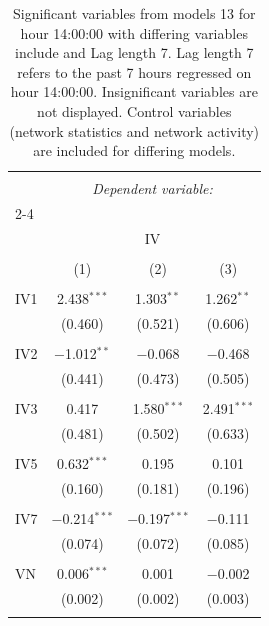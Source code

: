 
\begin{table}[!htbp] \centering 
  \caption{Significant variables from models 13 for hour 14:00:00 with differing variables include 
                               and Lag length 7. Lag length 7 refers to the past 7 hours regressed on hour 14:00:00. 
                               Insignificant variables are not displayed. 
                               Control variables (network statistics and network activity) are 
                               included for differing models.} 
  \label{IVmodels2_t_hourlagged1} 
\scriptsize 
\begin{tabular}{@{\extracolsep{5pt}}lccc} 
\\[-1.8ex]\hline 
\hline \\[-1.8ex] 
 & \multicolumn{3}{c}{\textit{Dependent variable:}} \\ 
\cline{2-4} 
\\[-1.8ex] & \multicolumn{3}{c}{IV} \\ 
\\[-1.8ex] & (1) & (2) & (3)\\ 
\hline \\[-1.8ex] 
 IV1 & 2.438$^{***}$ & 1.303$^{**}$ & 1.262$^{**}$ \\ 
  & (0.460) & (0.521) & (0.606) \\ 
  & & & \\ 
 IV2 & $-$1.012$^{**}$ & $-$0.068 & $-$0.468 \\ 
  & (0.441) & (0.473) & (0.505) \\ 
  & & & \\ 
 IV3 & 0.417 & 1.580$^{***}$ & 2.491$^{***}$ \\ 
  & (0.481) & (0.502) & (0.633) \\ 
  & & & \\ 
 IV5 & 0.632$^{***}$ & 0.195 & 0.101 \\ 
  & (0.160) & (0.181) & (0.196) \\ 
  & & & \\ 
 IV7 & $-$0.214$^{***}$ & $-$0.197$^{***}$ & $-$0.111 \\ 
  & (0.074) & (0.072) & (0.085) \\ 
  & & & \\ 
 VN & 0.006$^{***}$ & 0.001 & $-$0.002 \\ 
  & (0.002) & (0.002) & (0.003) \\ 
  & & & \\ 

\end{tabular}
\end{table}
